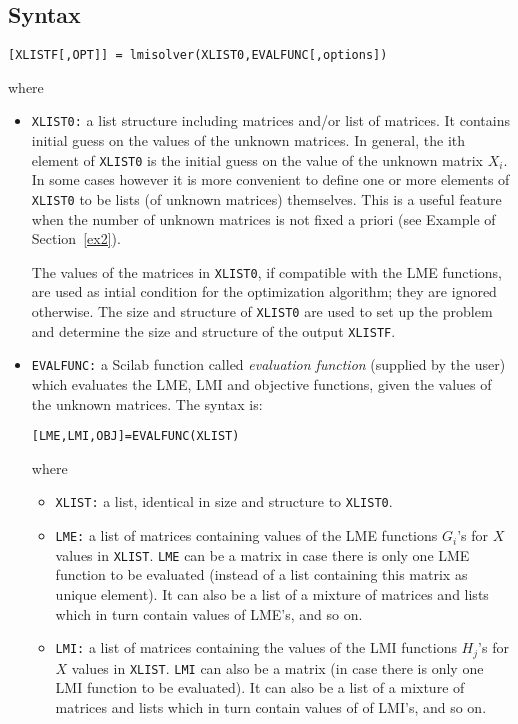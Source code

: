 \subsection{Syntax} 
\begin{verbatim}
[XLISTF[,OPT]] = lmisolver(XLIST0,EVALFUNC[,options])
\end{verbatim}
where
\begin{itemize}

\item {\tt XLIST0:} a list structure including matrices and/or list of matrices.
It contains initial guess on the values of the unknown matrices. In general, the
ith element of {\tt XLIST0} is the initial guess on the value of the
unknown matrix $X_i$. In some cases
however it is more convenient to define one or more elements of
{\tt XLIST0} to be lists (of unknown matrices) themselves. This is a
useful feature when the number of unknown matrices is not fixed a priori
(see Example of Section~\ref{ex2}).

The values of the matrices in {\tt XLIST0}, if compatible with the LME functions, 
are used as intial condition for the optimization algorithm; they are
ignored otherwise. The size and structure of {\tt XLIST0} are used to
set up the problem and determine the size and structure of the output {\tt XLISTF}.

\item
{\tt EVALFUNC:} a Scilab function called {\em evaluation function}
(supplied by the user)
which evaluates the LME, LMI and objective functions, given the values of the
unknown matrices. The syntax is:
\begin{verbatim}
[LME,LMI,OBJ]=EVALFUNC(XLIST)
\end{verbatim}
where
\begin{itemize}
\item {\tt XLIST:} a list, identical in size and structure to {\tt XLIST0}.

\item {\tt LME:} a list of matrices containing values of the LME
functions $G_i$'s
for $X$ values in {\tt XLIST}. {\tt LME} can be a matrix in case
there is only one LME function to be evaluated (instead of a list
containing this matrix as unique element). It can also be a list
of a mixture of matrices and lists which in turn contain values of
LME's, and so on.

\item {\tt LMI:} a list of matrices containing the values of the LMI
functions $H_j$'s
for $X$ values in {\tt XLIST}. {\tt LMI} can also be a matrix (in case
there is only one LMI function to be evaluated). It can also be a list
of a mixture of matrices and lists which in turn contain values of
of LMI's, and so on.


\end{itemize}
\end{itemize}
